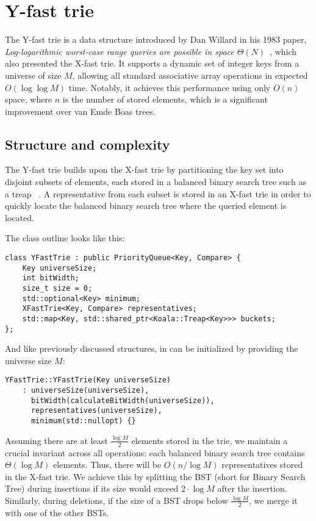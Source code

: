 \section{Y-fast trie}

The Y-fast trie is a data structure introduced by Dan Willard in his 1983 paper, \emph{Log-logarithmic worst-case range queries are possible in space \( \Theta(N) \)}~\cite{Willard1983}, which also presented the X-fast trie. It supports a dynamic set of integer keys from a universe of size \( M \), allowing all standard associative array operations in expected \( O(\log \log M) \) time. Notably, it achieves this performance using only \( O(n) \) space, where \( n \) is the number of stored elements, which is a significant improvement over van Emde Boas trees.

\subsection{Structure and complexity}

The Y-fast trie builds upon the X-fast trie by partitioning the key set into disjoint subsets of elements, each stored in a balanced binary search tree such as a treap~\cite{seidel1996treaps}
. A representative from each subset is stored in an X-fast trie in order to quickly locate the balanced binary search tree where the queried element is located.

The class outline looks like this:
\begin{verbatim}
class YFastTrie : public PriorityQueue<Key, Compare> {
    Key universeSize;
    int bitWidth;
    size_t size = 0;
    std::optional<Key> minimum;
    XFastTrie<Key, Compare> representatives;
    std::map<Key, std::shared_ptr<Koala::Treap<Key>>> buckets;
};
\end{verbatim}

And like previously discussed structures, in can be initialized by providing the universe size \(M\):

\begin{verbatim}
YFastTrie::YFastTrie(Key universeSize)
    : universeSize(universeSize),
      bitWidth(calculateBitWidth(universeSize)),
      representatives(universeSize),
      minimum(std::nullopt) {}
\end{verbatim}

Assuming there are at least \( \frac{\log M}{2} \) elements stored in the trie, we maintain a crucial invariant across all operations: each balanced binary search tree contains \( \Theta(\log M) \) elements. Thus, there will be \( O(n / \log M) \) representatives stored in the X-fast trie. We achieve this by splitting the BST (short for Binary Search Tree) during insertions if its size would exceed \( 2 \cdot \log M \) after the insertion. Similarly, during deletions, if the size of a BST drops below \( \frac{\log M}{2} \), we merge it with one of the other BSTs. 

